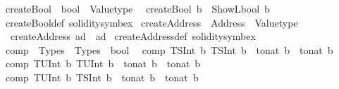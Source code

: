 \begin{isabellebody}
\isanewline
\isanewline
\isanewline
{}\isamarkupfalse%
\ createBool\ {\isacharcolon}{\kern0pt}{\isacharcolon}{\kern0pt}\ {\isachardoublequoteopen}bool\ {\isasymRightarrow}\ Valuetype{\isachardoublequoteclose}\isanewline
{}\isanewline
\ \ {\isachardoublequoteopen}createBool\ b\ {\isacharequal}{\kern0pt}\ ShowL\isactrlsub b\isactrlsub o\isactrlsub o\isactrlsub l\ b{\isachardoublequoteclose}\isanewline
\isanewline
{}\isamarkupfalse%
\ createBool{\isacharunderscore}{\kern0pt}def\ {\isacharbrackleft}{\kern0pt}solidity{\isacharunderscore}{\kern0pt}symbex{\isacharbrackright}{\kern0pt}\isanewline
\isanewline
{}\isamarkupfalse%
\ createAddress\ {\isacharcolon}{\kern0pt}{\isacharcolon}{\kern0pt}\ {\isachardoublequoteopen}Address\ {\isasymRightarrow}\ Valuetype{\isachardoublequoteclose}\isanewline
{}\isanewline
\ \ {\isachardoublequoteopen}createAddress\ ad\ {\isacharequal}{\kern0pt}\ ad{\isachardoublequoteclose}\isanewline
\isanewline
\isanewline
{}\isamarkupfalse%
\ createAddress{\isacharunderscore}{\kern0pt}def\ {\isacharbrackleft}{\kern0pt}solidity{\isacharunderscore}{\kern0pt}symbex{\isacharbrackright}{\kern0pt}\isanewline
\isanewline
{}\isamarkupfalse%
\ comp\ {\isacharcolon}{\kern0pt}{\isacharcolon}{\kern0pt}\ {\isachardoublequoteopen}Types\ {\isasymRightarrow}\ Types\ {\isasymRightarrow}\ bool{\isachardoublequoteclose}\isanewline
{}\isanewline
\ \ {\isachardoublequoteopen}comp\ {\isacharparenleft}{\kern0pt}TSInt\ b{}{\isacharparenright}{\kern0pt}\ {\isacharparenleft}{\kern0pt}TSInt\ b{}{\isacharparenright}{\kern0pt}\ {\isacharequal}{\kern0pt}\ {\isacharparenleft}{\kern0pt}to{\isacharunderscore}{\kern0pt}nat\ b{}\ {\isasymle}\ to{\isacharunderscore}{\kern0pt}nat\ b{}{\isacharparenright}{\kern0pt}{\isachardoublequoteclose}\isanewline
{\isacharbar}{\kern0pt}\ {\isachardoublequoteopen}comp\ {\isacharparenleft}{\kern0pt}TUInt\ b{}{\isacharparenright}{\kern0pt}\ {\isacharparenleft}{\kern0pt}TUInt\ b{}{\isacharparenright}{\kern0pt}\ {\isacharequal}{\kern0pt}\ {\isacharparenleft}{\kern0pt}to{\isacharunderscore}{\kern0pt}nat\ b{}\ {\isasymle}\ to{\isacharunderscore}{\kern0pt}nat\ b{}{\isacharparenright}{\kern0pt}{\isachardoublequoteclose}\isanewline
{\isacharbar}{\kern0pt}\ {\isachardoublequoteopen}comp\ {\isacharparenleft}{\kern0pt}TUInt\ b{}{\isacharparenright}{\kern0pt}\ {\isacharparenleft}{\kern0pt}TSInt\ b{}{\isacharparenright}{\kern0pt}\ {\isacharequal}{\kern0pt}\ {\isacharparenleft}{\kern0pt}to{\isacharunderscore}{\kern0pt}nat\ b{}\ {\isacharless}{\kern0pt}\ to{\isacharunderscore}{\kern0pt}nat\ b{}{\isacharparenright}{\kern0pt}{\isachardoublequoteclose}\isanewline

\end{isabellebody}
